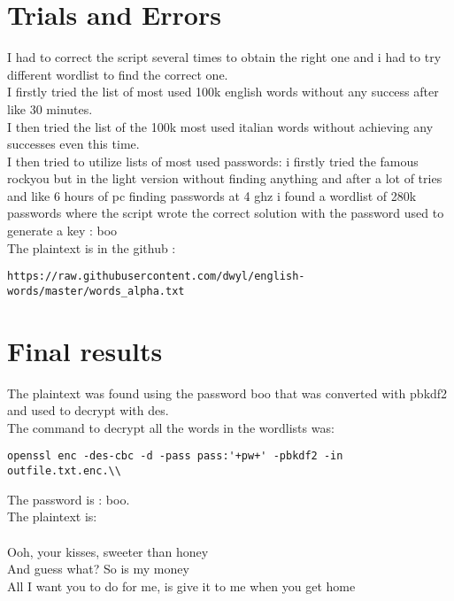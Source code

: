 \documentclass{article}
\begin{document}
\section{Trials and Errors}
I had to correct the script several times to obtain the right one and i had to try different wordlist to find the correct one.\\
I firstly tried the list of most used 100k english words without any success after like 30 minutes.\\
I then tried the list of the 100k most used italian words without achieving any successes even this time.\\
I then tried to utilize lists of most used passwords: i firstly tried the famous rockyou but in the light version without finding anything and after a lot of tries and like 6 hours of pc finding passwords at 4 ghz i found a wordlist of 280k passwords where the script wrote the correct solution with the password used to generate a key : boo\\
The plaintext is in the github :\\
\begin{verbatim}
https://raw.githubusercontent.com/dwyl/english-words/master/words_alpha.txt
\end{verbatim}

\section{Final results}
The plaintext was found using the password boo that was converted with pbkdf2 and used to decrypt with des.\\
The command to decrypt all the words in the wordlists was:\\
\begin{verbatim}
openssl enc -des-cbc -d -pass pass:'+pw+' -pbkdf2 -in outfile.txt.enc.\\

\end{verbatim}The password is : boo.\\
The plaintext is: \\\\Ooh, your kisses, sweeter than honey\\
And guess what? So is my money\\
All I want you to do for me, is give it to me when you get home\\
\end{document}
